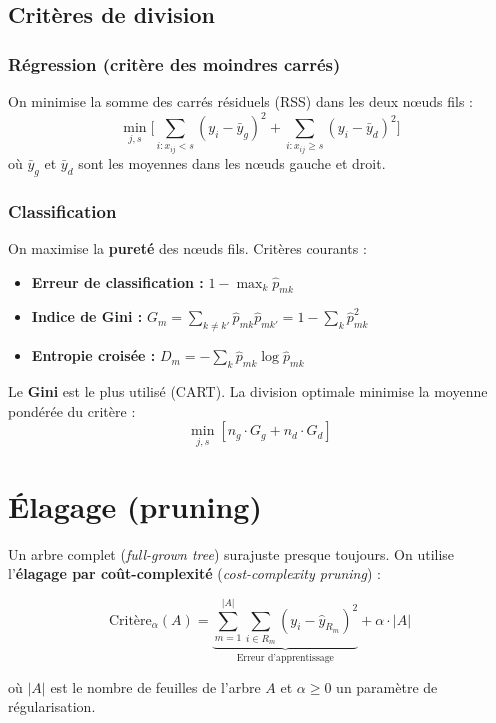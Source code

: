 \documentclass[a4paper,11pt]{article}
\begin{document}
\subsection{Critères de division}

\subsubsection{Régression (critère des moindres carrés)}
On minimise la somme des carrés résiduels (RSS) dans les deux nœuds fils :
\[
\min_{j,s} \Bigg[ \sum_{i: x_{ij} < s} (y_i - \bar{y}_{g})^2 + \sum_{i: x_{ij} \ge s} (y_i - \bar{y}_{d})^2 \Bigg]
\]
où $\bar{y}_{g}$ et $\bar{y}_{d}$ sont les moyennes dans les nœuds gauche et droit.

\subsubsection{Classification}
On maximise la \textbf{pureté} des nœuds fils. Critères courants :
\begin{itemize}
    \item \textbf{Erreur de classification :} $1 - \max_k \hat{p}_{mk}$
    \item \textbf{Indice de Gini :} $\displaystyle G_m = \sum_{k \neq k'} \hat{p}_{mk} \hat{p}_{mk'} = 1 - \sum_k \hat{p}_{mk}^2$
    \item \textbf{Entropie croisée :} $\displaystyle D_m = -\sum_k \hat{p}_{mk} \log \hat{p}_{mk}$
\end{itemize}

Le \textbf{Gini} est le plus utilisé (CART). La division optimale minimise la moyenne pondérée du critère :
\[
\min_{j,s} \left[ n_g \cdot G_g + n_d \cdot G_d \right]
\]

\section{Élagage (pruning)}

Un arbre complet (\textit{full-grown tree}) surajuste presque toujours. On utilise l'\textbf{élagage par coût-complexité} (\textit{cost-complexity pruning}) :

\[
\text{Critère}_{\alpha}(A) = \underbrace{\sum_{m=1}^{|A|} \sum_{i \in R_m} (y_i - \hat{y}_{R_m})^2}_{\text{Erreur d'apprentissage}} + \alpha \cdot |A|
\]

où $|A|$ est le nombre de feuilles de l'arbre $A$ et $\alpha \ge 0$ un paramètre de régularisation.
\end{document}
